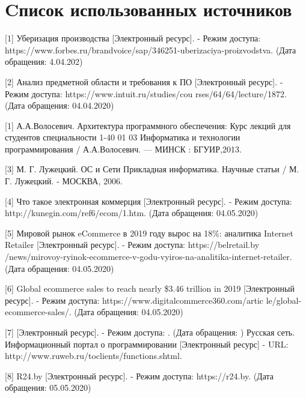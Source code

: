 
\section{Cписок использованных источников}

[1] Уберизация производства [Электронный ресурс]. - Режим доступа: https://www.forbes.ru/brandvoice/sap/346251-uberizaciya-proizvodstva. (Дата обращения: 4.04.202)

[2] Анализ предметной области и требования к ПО [Электронный ресурс]. - Режим доступа: https://www.intuit.ru/studies/cou  \linebreak rses/64/64/lecture/1872. (Дата обращения: 04.04.2020)

[1] А.А.Волосевич. Архитектура программного обеспечения: Курс лекций для студентов специальности 1-40 01 03 Информатика и технологии программирования / А.А.Волосевич. — МИНСК : БГУИР,2013.

[3] М. Г. Лужецкий. ОС и Сети Прикладная информатика. Научные статьи /  М. Г. Лужецкий. - МОСКВА, 2006.

[4] Что такое электронная коммерция [Электронный ресурс]. - Режим доступа: http://kunegin.com/ref6/ecom/1.htm. (Дата обращения: 04.05.2020)

[5] Мировой рынок eCommerce в 2019 году вырос на 18\%: аналитика Internet Retailer [Электронный ресурс]. - Режим доступа: https://belretail.by \linebreak/news/mirovoy-ryinok-ecommerce-v-godu-vyiros-na-analitika-internet-retailer. \linebreak (Дата обращения: 04.05.2020)

[6] Global ecommerce sales to reach nearly \$3.46 trillion in 2019 [Электронный ресурс]. - Режим доступа: https://www.digitalcommerce360.com/artic \linebreak le/global-ecommerce-sales/. (Дата обращения: 04.05.2020)

[7] [Электронный ресурс]. - Режим доступа: . (Дата обращения: )
Русская сеть. Информационный портал о программировании [Электронный ресурс] - URL: http://www.ruweb.ru/toclients/functions.shtml.

[8] R24.by [Электронный ресурс]. - Режим доступа: https://r24.by. (Дата обращения: 05.05.2020)


